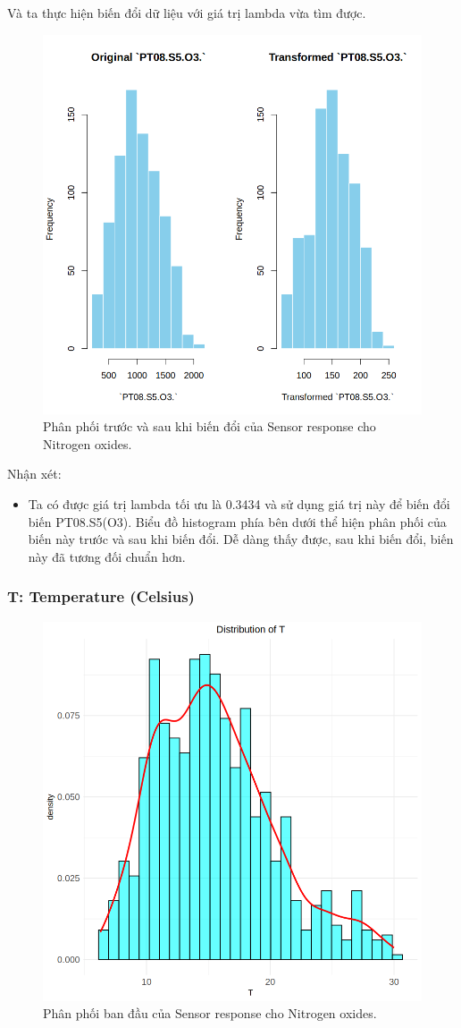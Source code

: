 Và ta thực hiện biến đổi dữ liệu với giá trị lambda vừa tìm được.
\begin{figure}[H]
    \centering
    \includegraphics[width=0.75\columnwidth]{air_figures/PT08.S5(O3)_transformed_distribution.png}
    \caption{Phân phối trước và sau khi biến đổi của Sensor response cho Nitrogen oxides.}
    \label{fig:pto3_transformed_distribution}
\end{figure}
Nhận xét:
\begin{itemize}
    \item Ta có được giá trị lambda tối ưu là 0.3434 và sử dụng giá trị này để biến đổi biến PT08.S5(O3). Biểu đồ histogram phía bên dưới thể hiện phân phối của biến này trước và sau khi biến đổi. Dễ dàng thấy được, sau khi biến đổi, biến này đã tương đối chuẩn hơn.
\end{itemize}

\subsubsection{T: Temperature (Celsius)}

\begin{figure}[H]
    \centering
    \includegraphics[width=0.75\columnwidth]{air_figures/T_original_distribution.png}
    \caption{Phân phối ban đầu của Sensor response cho Nitrogen oxides.}
    \label{fig:t_original_distribution}
\end{figure}

